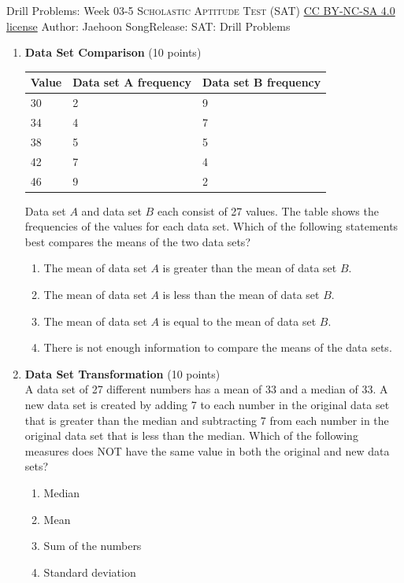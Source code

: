 \newpage\handout
{Drill Problems: Week 03-5}
{\textsc{Scholastic Aptitude Test (SAT)}}
{\href{https://creativecommons.org/licenses/by-nc-sa/4.0/}{CC BY-NC-SA 4.0 license}}
{Author: Jaehoon Song}{Release: \generatedOn}
{SAT: Drill Problems}


\begin{enumerate}
  \item \textbf{Data Set Comparison} (10 points)\\
  \begin{center}
  \begin{tabular}{|l|l|l|}
  \hline
  Value & Data set A frequency & Data set B frequency \\
  \hline
  30 & 2 & 9 \\
  \hline
  34 & 4 & 7 \\
  \hline
  38 & 5 & 5 \\
  \hline
  42 & 7 & 4 \\
  \hline
  46 & 9 & 2 \\
  \hline
  \end{tabular}
  \end{center}

  Data set $A$ and data set $B$ each consist of 27 values. The table shows the frequencies of the values for each data set. Which of the following statements best compares the means of the two data sets?
  \begin{enumerate}[label=(\Alph*)]
    \item The mean of data set $A$ is greater than the mean of data set $B$.
    \item The mean of data set $A$ is less than the mean of data set $B$.
    \item The mean of data set $A$ is equal to the mean of data set $B$.
    \item There is not enough information to compare the means of the data sets.
  \end{enumerate}
  \begin{subanswer}
  \end{subanswer}

  \item \textbf{Data Set Transformation} (10 points)\\
  A data set of 27 different numbers has a mean of 33 and a median of 33. A new data set is created by adding 7 to each number in the original data set that is greater than the median and subtracting 7 from each number in the original data set that is less than the median. Which of the following measures does NOT have the same value in both the original and new data sets?
  \begin{enumerate}[label=(\Alph*)]
    \item Median
    \item Mean
    \item Sum of the numbers
    \item Standard deviation
  \end{enumerate}
  \begin{subanswer}
  \end{subanswer}


\end{enumerate}
